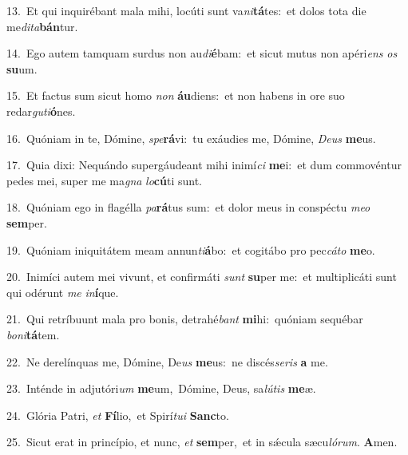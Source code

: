 {\numbfont\textcolor{\numbcolor}{13.}}~Et qui inquirébant mala mihi, locúti sunt va\-\textit{ni}\-\textbf{tá}tes:~\star et dolos tota die me\-\textit{di}\-\textit{ta}\textbf{bán}tur.\par
{\numbfont\textcolor{\numbcolor}{14.}}~Ego autem tamquam surdus non au\-\textit{di}\-\textbf{é}bam:~\star et sicut mutus non apéri\textit{ens} \textit{os} \textbf{su}\-um.\par
{\numbfont\textcolor{\numbcolor}{15.}}~Et factus sum sicut homo \textit{non} \textbf{áu}\-diens:~\star et non habens in ore suo redar\-\textit{gu}\-\textit{ti}\textbf{ó}nes.\par
{\numbfont\textcolor{\numbcolor}{16.}}~Quóniam in te, Dómine, \textit{spe}\-\textbf{rá}vi:~\star tu exáudies me, Dómine, \textit{De}\-\textit{us} \textbf{me}\-us.\par
{\numbfont\textcolor{\numbcolor}{17.}}~Quia dixi: Nequándo supergáudeant mihi inimí\textit{ci} \textbf{me}\-i:~\star et dum commovéntur pedes mei, super me ma\textit{gna} \textit{lo}\-\textbf{cú}ti sunt.\par
{\numbfont\textcolor{\numbcolor}{18.}}~Quóniam ego in flagélla \textit{pa}\-\textbf{rá}tus sum:~\star et dolor meus in conspéctu \textit{me}\-\textit{o} \textbf{sem}\-per.\par
{\numbfont\textcolor{\numbcolor}{19.}}~Quóniam iniquitátem meam annun\-\textit{ti}\-\textbf{á}bo:~\star et cogitábo pro pec\-\textit{cá}\-\textit{to} \textbf{me}\-o.\par
{\numbfont\textcolor{\numbcolor}{20.}}~Inimíci autem mei vivunt, et confirmáti \textit{sunt} \textbf{su}\-per me:~\star et multiplicáti sunt qui odérunt \textit{me} \textit{in}\-\textbf{í}que.\par
{\numbfont\textcolor{\numbcolor}{21.}}~Qui retríbuunt mala pro bonis, detrahé\textit{bant} \textbf{mi}\-hi:~\star quóniam sequébar \textit{bo}\-\textit{ni}\textbf{tá}tem.\par
{\numbfont\textcolor{\numbcolor}{22.}}~Ne derelínquas me, Dómine, De\textit{us} \textbf{me}\-us:~\star ne discés\-\textit{se}\-\textit{ris} \textbf{a} me.\par
{\numbfont\textcolor{\numbcolor}{23.}}~Inténde in adjutóri\textit{um} \textbf{me}\-um,~\star Dómine, Deus, sa\-\textit{lú}\-\textit{tis} \textbf{me}\-æ.\par
{\numbfont\textcolor{\numbcolor}{24.}}~Glória Patri, \textit{et} \textbf{Fí}\-lio,~\star et Spirí\-\textit{tu}\-\textit{i} \textbf{Sanc}\-to.\par
{\numbfont\textcolor{\numbcolor}{25.}}~Sicut erat in princípio, et nunc, \textit{et} \textbf{sem}\-per,~\star et in sǽcula sæcu\-\textit{ló}\-\textit{rum}. \textbf{A}\-men.\par
